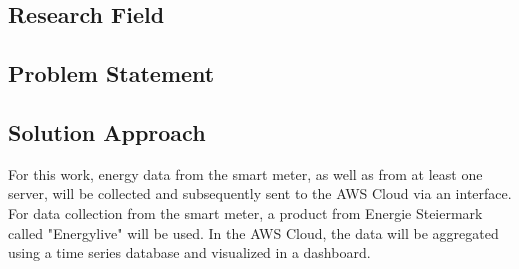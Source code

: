 \subsection{Research Field}

\subsection{Problem Statement}

\subsection{Solution Approach}
For this work, energy data from the smart meter, as well as from at least one server, will be collected and subsequently sent to the AWS Cloud via an interface.
For data collection from the smart meter, a product from Energie Steiermark called "Energylive" will be used.
In the AWS Cloud, the data will be aggregated using a time series database and visualized in a dashboard.

